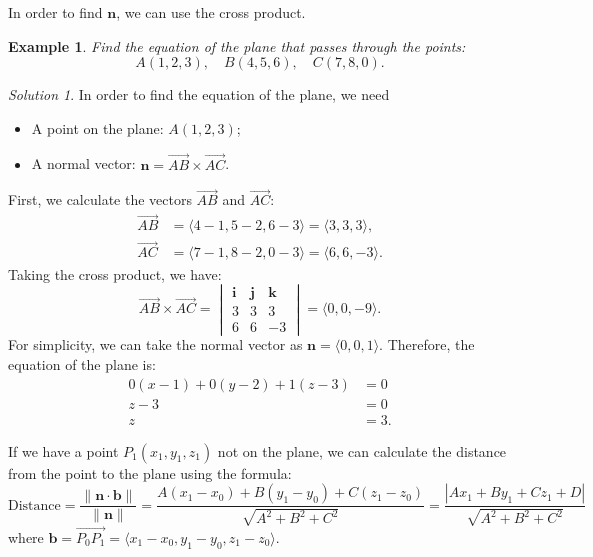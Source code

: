\documentclass{book}
\newtheorem{example}{Example}[chapter]
\theoremstyle{remark}
\newtheorem*{solution}{Solution}
\begin{document}
In order to find $\mathbf{n}$, we can use the cross product.
\begin{example}
    Find the equation of the plane that passes through the points:
    \[
        A(1, 2, 3), \quad B(4, 5, 6), \quad C(7, 8, 0).
    \]
\end{example}
\begin{solution}
    In order to find the equation of the plane, we need
    \begin{itemize}
        \item A point on the plane: $A(1, 2, 3)$;
        \item A normal vector: $\mathbf{n} = \overrightarrow{AB} \times \overrightarrow{AC}$.
    \end{itemize}
    First, we calculate the vectors $\overrightarrow{AB}$ and $\overrightarrow{AC}$:
    \[
        \begin{split}
            \overrightarrow{AB} &= \langle 4 - 1, 5 - 2, 6 - 3 \rangle = \langle 3, 3, 3 \rangle, \\
            \overrightarrow{AC} &= \langle 7 - 1, 8 - 2, 0 - 3 \rangle = \langle 6, 6, -3 \rangle.
        \end{split}
    \]
    Taking the cross product, we have:
    \[
        \overrightarrow{AB} \times \overrightarrow{AC} = \begin{vmatrix}
        \mathbf{i} & \mathbf{j} & \mathbf{k} \\
        3 & 3 & 3 \\
        6 & 6 & -3
        \end{vmatrix} = \langle 0, 0, -9 \rangle.
    \]
    For simplicity, we can take the normal vector as $\mathbf{n} = \langle 0, 0, 1 \rangle$. Therefore, the equation of the plane is:
    \[
        \begin{split}
            0(x - 1) + 0(y - 2) + 1(z - 3) &= 0 \\
            z - 3 &= 0 \\
            z &= 3.
        \end{split}
    \]
\end{solution}

If we have a point $P_1(x_1, y_1, z_1)$ not on the plane, we can calculate the distance from the point to the plane using the formula:
\[
    \text{Distance} = \frac{\| \mathbf{n} \cdot \mathbf{b} \|}{\| \mathbf{n} \|} = \frac{A(x_1 - x_0) + B(y_1 - y_0) + C(z_1 - z_0)}{\sqrt{A^2 + B^2 + C^2}} = \frac{|A x_1 + B y_1 + C z_1 + D|}{\sqrt{A^2 + B^2 + C^2}}
\]
where $\mathbf{b} = \overrightarrow{P_0P_1} = \langle x_1 - x_0, y_1 - y_0, z_1 - z_0 \rangle$.
\end{document}
